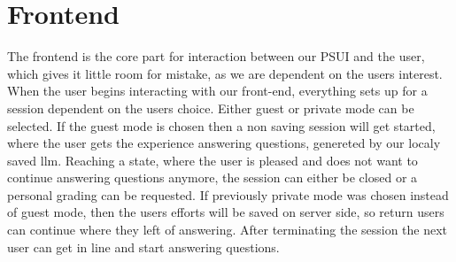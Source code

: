 \chapter{Frontend}

The frontend is the core part for interaction between our PSUI and the user, which gives it little room for mistake, as we are dependent on the users interest.
When the user begins interacting with our front-end, everything sets up for a session dependent on the users choice.
Either guest or private mode can be selected.
If the guest mode is chosen then a non saving session will get started, where the user gets the experience answering questions,
genereted by our localy saved llm.
Reaching a state, where the user is pleased and does not want to continue answering questions anymore, the session can either be closed or a personal grading can be requested.
If previously private mode was chosen instead of guest mode, then the users efforts will be saved on server side, so return users can continue where they left of answering.
After terminating the session the next user can get in line and start answering questions.






